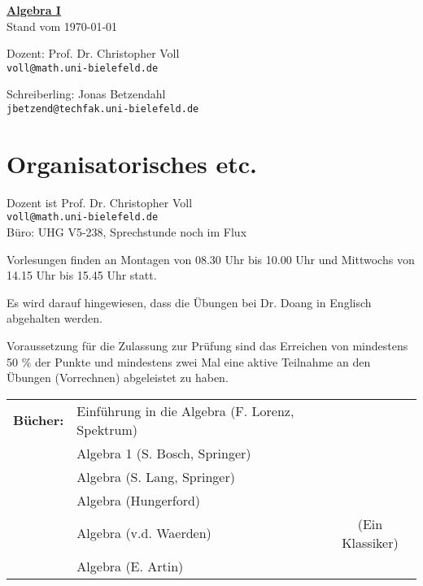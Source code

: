 \documentclass[10pt,a4paper]{article}
\author{Jonas Betzendahl}
\date{\today}
\begin{document}
\newcommand{\menge}[2]{$\{\,{#1}\,\vert\,{#2}\,\}$}
\parindent0pt

\begin{center}

\Huge \textbf{\underline{Algebra I}} \\\bigskip
\normalsize\normalsize Stand vom \today\\

\begin{multicols}{2}
Dozent: Prof. Dr. Christopher Voll\\
\texttt{voll@math.uni-bielefeld.de   }\bigskip

Schreiberling: Jonas Betzendahl\\
\texttt{jbetzend@techfak.uni-bielefeld.de}\bigskip
\end{multicols}
\end{center}

\tableofcontents
\newpage

\setcounter{section}{-2} %


\section{Organisatorisches etc.}

Dozent ist Prof. Dr. Christopher Voll\\
\texttt{voll@math.uni-bielefeld.de}\\
Büro: UHG V5-238, Sprechstunde noch im Flux\bigskip

Vorlesungen finden an Montagen von 08.30 Uhr bis 10.00 Uhr und Mittwochs von 14.15 Uhr bis 15.45 Uhr statt.\bigskip

Es wird darauf hingewiesen, dass die Übungen bei Dr. Doang in Englisch abgehalten werden.\bigskip

Voraussetzung für die Zulassung zur Prüfung sind das Erreichen von mindestens 50 \% der Punkte und mindestens zwei Mal eine aktive Teilnahme an den Übungen (Vorrechnen) abgeleistet zu haben.\bigskip

\begin{tabular}{rlc}
\textbf{Bücher:} & Einführung in die Algebra (F. Lorenz, Spektrum)&\\
        & Algebra 1 (S. Bosch, Springer)&\\
        & Algebra (S. Lang, Springer)&\\
        & Algebra (Hungerford)&\\
        & Algebra (v.d. Waerden) & (Ein Klassiker)\\
        & Algebra (E. Artin) &
\end{tabular}\bigskip
\end{document}
